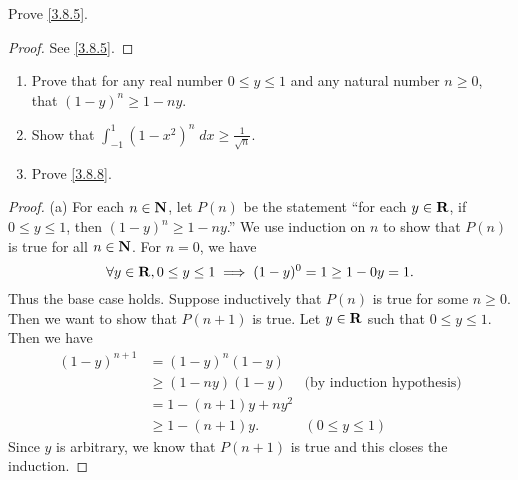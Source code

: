\exercisesection

\begin{exercise}\label{ex 3.8.1}
  Prove \cref{3.8.5}.
\end{exercise}

\begin{proof}
  See \cref{3.8.5}.
\end{proof}

\begin{exercise}\label{ex 3.8.2}
  \quad
  \begin{enumerate}
    \item Prove that for any real number \(0 \leq y \leq 1\) and any natural number \(n \geq 0\), that \((1 - y)^n \geq 1 - ny\).
    \item Show that \(\int_{-1}^1 (1 - x^2)^n \; dx \geq \frac{1}{\sqrt{n}}\).
    \item Prove \cref{3.8.8}.
  \end{enumerate}
\end{exercise}

\begin{proof}{(a)}
  For each \(n \in \mathbf{N}\), let \(P(n)\) be the statement ``for each \(y \in \mathbf{R}\), if \(0 \leq y \leq 1\), then \((1 - y)^n \geq 1 - ny\).''
  We use induction on \(n\) to show that \(P(n)\) is true for all \(n \in \mathbf{N}\).
  For \(n = 0\), we have
  \[
    \forall y \in \mathbf{R}, 0 \leq y \leq 1 \implies (1 - y)^0 = 1 \geq 1 - 0y = 1.
  \]
  Thus the base case holds.
  Suppose inductively that \(P(n)\) is true for some \(n \geq 0\).
  Then we want to show that \(P(n + 1)\) is true.
  Let \(y \in \mathbf{R}\) such that \(0 \leq y \leq 1\).
  Then we have
  \begin{align*}
    (1 - y)^{n + 1} & = (1 - y)^n (1 - y)                                       \\
                    & \geq (1 - ny) (1 - y)  & \text{(by induction hypothesis)} \\
                    & = 1 - (n + 1)y + n y^2                                    \\
                    & \geq 1 - (n + 1)y.     & (0 \leq y \leq 1)
  \end{align*}
  Since \(y\) is arbitrary, we know that \(P(n + 1)\) is true and this closes the induction.
\end{proof}

